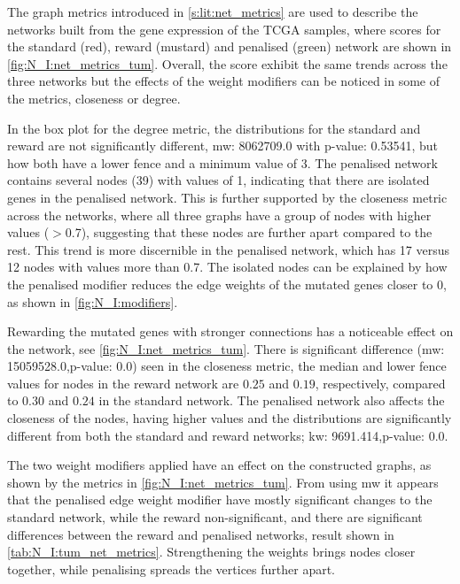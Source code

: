 The graph metrics introduced in \cref{s:lit:net_metrics} are used to describe the networks built from the gene expression of the TCGA samples, where scores for the standard (red), reward (mustard) and penalised (green) network are shown in \cref{fig:N_I:net_metrics_tum}. Overall, the score exhibit the same trends across the three networks but the effects of the weight modifiers can be noticed in some of the metrics, closeness or degree.

In the box plot for the degree metric, the distributions for the standard and reward are not significantly different, \acrfull{mw}: 8062709.0 with p-value: 0.53541, but how both have a lower fence and a minimum value of 3. The penalised network contains several nodes (39) with values of 1, indicating that there are isolated genes in the penalised network. This is further supported by the closeness metric across the networks, where all three graphs have a group of nodes with higher values ($>$0.7), suggesting that these nodes are further apart compared to the rest. This trend is more discernible in the penalised network, which has 17 versus 12 nodes with values more than 0.7. The isolated nodes can be explained by how the penalised modifier reduces the edge weights of the mutated genes closer to 0, as shown in \cref{fig:N_I:modifiers}.

Rewarding the mutated genes with stronger connections has a noticeable effect on the network, see \cref{fig:N_I:net_metrics_tum}. There is significant difference (\acrshort{mw}: 15059528.0,p-value: 0.0) seen in the closeness metric, the median and lower fence values for nodes in the reward network are $0.25$ and $0.19$, respectively, compared to $0.30$ and $0.24$ in the standard network. The penalised network also affects the closeness of the nodes, having higher values and the distributions are significantly different from both the standard and reward networks; \acrfull{kw}: 9691.414,p-value: 0.0. 

The two weight modifiers applied have an effect on the constructed graphs, as shown by the metrics in \cref{fig:N_I:net_metrics_tum}. From using \acrlong{mw} it appears that the penalised edge weight modifier have mostly significant changes to the standard network, while the reward non-significant, and there are significant differences between the reward and penalised networks, result shown in \cref{tab:N_I:tum_net_metrics}. Strengthening the weights brings nodes closer together, while penalising spreads the vertices further apart. 

